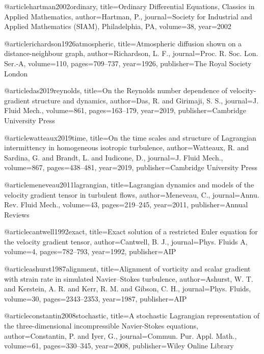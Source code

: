   @article{hartman2002ordinary,
    title={{Ordinary Differential Equations, Classics in Applied Mathematics}},
    author={Hartman, P.},
    journal={Society for Industrial and Applied Mathematics (SIAM), Philadelphia, PA},
    volume={38},
    year={2002}
  }

  @article{richardson1926atmospheric,
    title={{Atmospheric diffusion shown on a distance-neighbour graph}},
    author={Richardson, L. F.},
    journal={Proc. R. Soc. Lon. Ser.-A},
    volume={110},
    pages={709--737},
    year={1926},
    publisher={The Royal Society London}
  }

  @article{das2019reynolds,
    title={{On the Reynolds number dependence of velocity-gradient structure and dynamics}},
    author={Das, R. and Girimaji, S. S.},
    journal={J. Fluid Mech.},
    volume={861},
    pages={163--179},
    year={2019},
    publisher={Cambridge University Press}
  }

  @article{watteaux2019time,
    title={{On the time scales and structure of Lagrangian intermittency in homogeneous isotropic turbulence}},
    author={Watteaux, R. and Sardina, G. and Brandt, L. and Iudicone, D.},
    journal={J. Fluid Mech.},
    volume={867},
    pages={438--481},
    year={2019},
    publisher={Cambridge University Press}
  }

  @article{meneveau2011lagrangian,
    title={{Lagrangian dynamics and models of the velocity gradient tensor in turbulent flows}},
    author={Meneveau, C.},
    journal={Annu. Rev. Fluid Mech.},
    volume={43},
    pages={219--245},
    year={2011},
    publisher={Annual Reviews}
  }

  @article{cantwell1992exact,
    title={{Exact solution of a restricted Euler equation for the velocity gradient tensor}},
    author={Cantwell, B. J.},
    journal={Phys. Fluids A},
    volume={4},
    pages={782--793},
    year={1992},
    publisher={AIP}
  }

  @article{ashurst1987alignment,
    title={{Alignment of vorticity and scalar gradient with strain rate in simulated Navier--Stokes turbulence}},
    author={Ashurst, W. T. and Kerstein, A. R. and Kerr, R. M. and Gibson, C. H.},
    journal={Phys. Fluids},
    volume={30},
    pages={2343--2353},
    year={1987},
    publisher={AIP}
  }

  @article{constantin2008stochastic,
    title={{A stochastic Lagrangian representation of the three-dimensional incompressible Navier-Stokes equations}},
    author={Constantin, P. and Iyer, G.},
    journal={Commun. Pur. Appl. Math.},
    volume={61},
    pages={330--345},
    year={2008},
    publisher={Wiley Online Library}
  }

